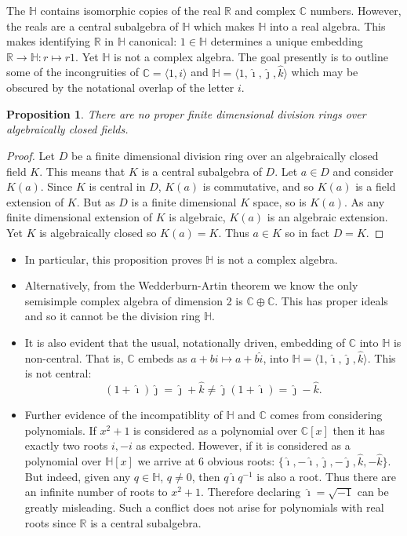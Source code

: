 \documentclass[12pt]{article}
\newtheorem{prop}[thm]{Proposition}
\begin{document}
The  $\mathbb{H}$ contains isomorphic copies of the real $\mathbb{R}$ and complex $\mathbb{C}$ numbers.  However, the reals are a central subalgebra of $\mathbb{H}$ which makes $\mathbb{H}$ into a real algebra.  This makes identifying $\mathbb{R}$ in $\mathbb{H}$ canonical: $1\in \mathbb{H}$ determines a unique embedding $\mathbb{R}\rightarrow \mathbb{H}:r\mapsto r1$.  Yet $\mathbb{H}$ is not a complex algebra.  The goal presently is to outline some of the incongruities of $\mathbb{C}=\langle 1,i\rangle$ and $\mathbb{H}=\langle 1,\hat{\imath},\hat{\jmath},\hat{k}\rangle$ which may be obscured by the notational overlap of the letter $i$.

\begin{prop}
There are no proper finite dimensional division rings over algebraically closed fields.
\end{prop}
\begin{proof}
Let $D$ be a finite dimensional division ring over an algebraically closed field $K$.  This means that $K$ is a central subalgebra of $D$.  Let $a\in D$ and consider
$K(a)$.  Since $K$ is central in $D$, $K(a)$ is commutative, and so $K(a)$ is a field extension of $K$.  But as $D$ is a finite dimensional $K$ space, so is $K(a)$.  As any finite dimensional extension of $K$ is algebraic, $K(a)$ is an algebraic extension.  Yet $K$ is algebraically closed so $K(a)=K$.  Thus $a\in K$ so in fact $D=K$.
\end{proof}
\begin{itemize}
\item In particular, this proposition proves $\mathbb{H}$ is not a complex algebra.
\item
Alternatively, from the Wedderburn-Artin theorem we know the only semisimple complex algebra of dimension 2 is $\mathbb{C}\oplus\mathbb{C}$.  This has proper ideals and so it cannot be the division ring $\mathbb{H}$.
\item
It is also evident that the usual, notationally driven, embedding of $\mathbb{C}$ into $\mathbb{H}$ is non-central.  That is, $\mathbb{C}$ embeds as $a+bi\mapsto a+b\hat{i}$, into $\mathbb{H}=\langle 1, \hat{\imath},\hat{\jmath},\hat{k}\rangle$.  This is not central:
\[(1+\hat{\imath})\hat{\jmath}=\hat{\jmath}+\hat{k}\neq \hat{\jmath}(1+\hat{\imath})=\hat{\jmath}-\hat{k}.\]
\item
Further evidence of the incompatiblity of $\mathbb{H}$ and $\mathbb{C}$ comes from considering polynomials.  If $x^2+1$ is considered as a polynomial over $\mathbb{C}[x]$ then it has exactly two roots $i, -i$ as expected.  However, if it is considered as a polynomial over $\mathbb{H}[x]$ we arrive at 6 obvious roots: $\{\hat{\imath},-\hat{\imath},\hat{\jmath},-\hat{\jmath},\hat{k},-\hat{k}\}$.  But indeed, given any $q\in\mathbb{H}$, $q\neq 0$, then $q\hat{\imath}q^{-1}$ is also a root.  Thus there are an infinite number of roots to $x^2+1$.  Therefore declaring  $\hat{\imath}=\sqrt{-1}$ can be greatly misleading.  Such a conflict does not arise for polynomials with real roots since $\mathbb{R}$ is a central subalgebra.
\end{itemize}

\end{document}
